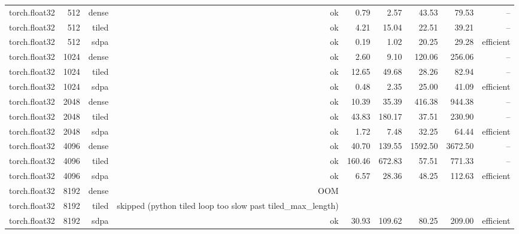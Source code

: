 \begin{tabular}{lrrrrrrrr}
torch.float32 & 512 & dense & ok & 0.79 & 2.57 & 43.53 & 79.53 & -- \\
torch.float32 & 512 & tiled & ok & 4.21 & 15.04 & 22.51 & 39.21 & -- \\
torch.float32 & 512 & sdpa & ok & 0.19 & 1.02 & 20.25 & 29.28 & efficient \\
torch.float32 & 1024 & dense & ok & 2.60 & 9.10 & 120.06 & 256.06 & -- \\
torch.float32 & 1024 & tiled & ok & 12.65 & 49.68 & 28.26 & 82.94 & -- \\
torch.float32 & 1024 & sdpa & ok & 0.48 & 2.35 & 25.00 & 41.09 & efficient \\
torch.float32 & 2048 & dense & ok & 10.39 & 35.39 & 416.38 & 944.38 & -- \\
torch.float32 & 2048 & tiled & ok & 43.83 & 180.17 & 37.51 & 230.90 & -- \\
torch.float32 & 2048 & sdpa & ok & 1.72 & 7.48 & 32.25 & 64.44 & efficient \\
torch.float32 & 4096 & dense & ok & 40.70 & 139.55 & 1592.50 & 3672.50 & -- \\
torch.float32 & 4096 & tiled & ok & 160.46 & 672.83 & 57.51 & 771.33 & -- \\
torch.float32 & 4096 & sdpa & ok & 6.57 & 28.36 & 48.25 & 112.63 & efficient \\
torch.float32 & 8192 & dense & OOM &  &  &  &  &  \\
torch.float32 & 8192 & tiled & skipped (python tiled loop too slow past tiled\_max\_length) &  &  &  &  &  \\
torch.float32 & 8192 & sdpa & ok & 30.93 & 109.62 & 80.25 & 209.00 & efficient \\
\bottomrule
\end{tabular}
